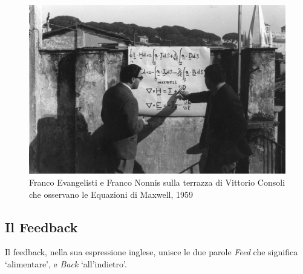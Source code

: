 \begin{figure}[h!]
    \begin{center}
        \vspace{0.5cm}
        \includegraphics[width=14cm]{figures/EvangelistiNonnis.jpg}
        \caption{Franco Evangelisti e Franco Nonnis sulla terrazza di Vittorio Consoli 
        che osservano le Equazioni di Maxwell, 1959}
        \vspace{0.5cm}
        \end{center}
\end{figure} 

\subsection{Il Feedback}
\label{sec:Il Feedback}
Il feedback, nella sua espressione inglese, 
unisce le due parole \textit{Feed} che significa ‘alimentare’, 
e \textit{Back} ‘all’indietro’. 


